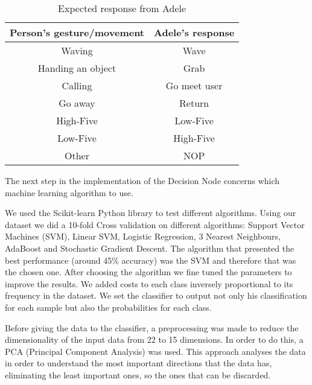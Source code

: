 \begin{table}[!h]
\centering
\caption{Expected response from Adele}
\label{tab:expected_response}
\begin{tabular}{|c|c|}
\hline
\textbf{Person's gesture/movement} & \textbf{Adele's response} \\ \hline
Waving                           & Wave                                 \\
Handing an object                & Grab                            		\\
Calling                          & Go meet user                         \\
Go away                          & Return                       \\
High-Five                        & Low-Five                             \\
Low-Five                         & High-Five                            \\
Other	                           & NOP                                  \\ \hline
\end{tabular}
\end{table}

The next step in the implementation of the Decision Node concerns which machine learning algorithm to use.

We used the Scikit-learn Python library \cite{Scikit-Learn} to test different algorithms. Using our dataset we did a 10-fold Cross validation on different algorithms: Support Vector Machines (SVM), Linear SVM, Logistic Regression, 3 Nearest Neighbours, AdaBoost and Stochastic Gradient Descent. The algorithm that presented the best performance (around 45\% accuracy) was the SVM and therefore that was the chosen one. After choosing the algorithm we fine tuned the parameters to improve the results. We added costs to each class inversely proportional to its frequency in the dataset. We set the classifier to output not only his classification for each sample but also the probabilities for each class.

Before giving the data to the classifier, a preprocessing was made to reduce the dimensionality of the input data from 22 to 15 dimensions. In order to do this, a PCA (Principal Component Analysis)\cite{PCA} was used. This approach analyses the data in order to understand the most important directions that the data has, eliminating the least important ones, so the ones that can be discarded. 

